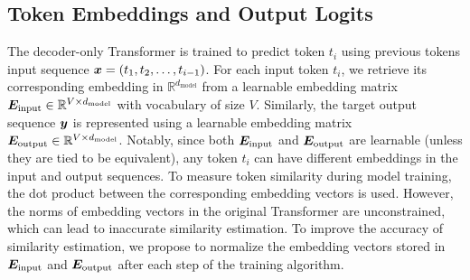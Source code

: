 \documentclass{article} %
\begin{document}
\subsection{Token Embeddings and Output Logits}
The decoder-only Transformer  is 
trained to predict 
token $t_i$ using previous tokens 
input sequence ${\bm{x}}=(t_1, t_2, \dots, t_{i-1}) $. 
For each input token $t_i$, we retrieve its corresponding embedding in  $\mathbb{R}^{d_{\text{model}}}$ from a learnable embedding matrix ${\bm{E}}_{\text{input}} \in \mathbb{R}^{V \times d_{\text{model}}}$ with vocabulary of size $V$. Similarly, the target output sequence ${\bm{y}}$ is represented using a learnable embedding matrix ${\bm{E}}_{\text{output}} \in \mathbb{R}^{V \times d_{\text{model}}}$. Notably, since both ${\bm{E}}_{\text{input}}$ and ${\bm{E}}_{\text{output}}$ are learnable (unless they are tied to be equivalent), any token $t_i$ can have different embeddings in the input and output sequences. 
To measure token similarity during model training, the dot product between the corresponding embedding vectors is used. However, the norms of embedding vectors in the original Transformer are unconstrained, which can lead to inaccurate similarity estimation. 
To improve the accuracy of similarity estimation, we propose to normalize the embedding vectors stored in ${\bm{E}}_{\text{input}}$ and ${\bm{E}}_{\text{output}}$ after each step of the training algorithm. 

\end{document}
